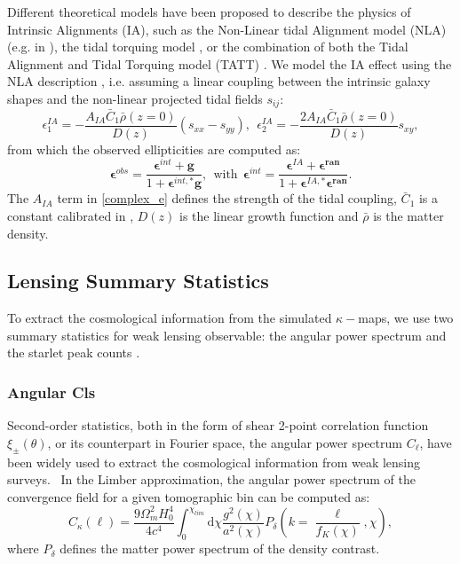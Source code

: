 \documentclass{aa}
\begin{document}
Different theoretical models have been proposed to describe the physics of Intrinsic Alignments (IA), such as the Non-Linear tidal Alignment model (NLA) (e.g. in \citet{Bridle_2007}), the tidal torquing model \citep{PhysRevD.70.063526, 10.1046/j.1365-8711.2001.04105.x}, or the combination of both the Tidal Alignment and Tidal Torquing model (TATT)  \citep{PhysRevD.100.103506}.
We model the IA effect using the NLA description \citep{harnois2021cosmic}, i.e. assuming a linear coupling between the intrinsic galaxy shapes and the non-linear projected tidal fields $s_{ij}$:
\begin{equation}\label{complex_e}
    \epsilon_{1}^{IA}=- \frac{A_{IA}\bar{C}_1\bar{\rho}(z=0)}{D(z)} (s_{xx}-s_{yy}), \ \ 
      \epsilon_{2}^{IA}=-\frac{2A_{IA}\bar{C}_1\bar{\rho}(z=0)}{D(z)} s_{xy},
\end{equation}
from which the observed ellipticities are computed as:
 \begin{equation}
    \boldsymbol{\epsilon}^{obs}=
    \frac{\boldsymbol{\epsilon}^{int}+\textbf{g}}{1+\boldsymbol{\epsilon}^{int,*}\textbf{g}}, \ \  \text{with}  \ \
    \boldsymbol{\epsilon}^{int}=
    \frac{\boldsymbol{\epsilon}^{
     IA}+\boldsymbol{\epsilon^{ran}}}
     {1+\boldsymbol{\epsilon}^{IA,*}\boldsymbol{\epsilon^{ran}}}.
\end{equation}
The $A_{IA}$ term in \autoref{complex_e} defines the strength of the tidal coupling, $\bar{C}_1$ is a constant
calibrated in \citet{brown2002measurement}, $D(z)$ is the linear growth function and $\bar{\rho}$ is the matter density.
 
\subsection{Lensing Summary Statistics }\label{stat}
To extract the cosmological information from the simulated $\kappa-$maps, we use two summary statistics for weak lensing observable: the angular power spectrum and the starlet peak counts \citep{lin2016new}. 

\subsubsection{Angular Cls
}
Second-order statistics, both in the form of shear 2-point correlation function $\xi_{\pm}(\theta)$, or its counterpart in Fourier space, the angular power spectrum $C_{\ell}$, have been widely used to extract the cosmological information from weak lensing surveys. \
In the Limber approximation, the angular power spectrum of the convergence field for a given tomographic bin can be computed as:
\begin{equation}
    C_{\kappa}(\ell)=\frac{9\Omega_m^2H_0^4}{4c^4}
    \int_0^{\chi_{lim}} \text{d}\chi 
    \frac{g^2(\chi)}{a^2(\chi)}P_{\delta}
    	\left( k=\frac{\ell}{f_K(\chi)},\chi \right),
\end{equation}
where $P_{\delta}$ defines the matter power spectrum of the density contrast.
\end{document}
